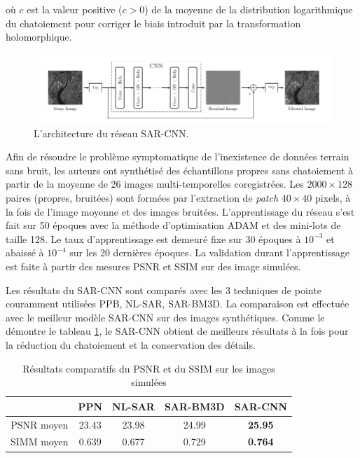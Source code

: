 où $c$ est la valeur positive ($c > 0$) de la moyenne de la distribution logarithmique du chatoiement pour corriger le biais introduit par la transformation holomorphique.

\begin{figure}
  \includegraphics[width=\linewidth]{figures/geo6393/SAR-CNN.png}
   \centering
  \caption{L'architecture du réseau SAR-CNN.}
  \label{fig:SAR-CNN}
\end{figure}

Afin de résoudre le problème symptomatique de l'inexistence de données terrain sans bruit, les auteurs ont synthétisé des échantillons propres sans chatoiement à partir de la moyenne de 26 images \acrsar multi-temporelles coregistrées. Les $2000 \times 128$ paires (propres, bruitées) sont formées par l'extraction de \textit{patch} $40 \times 40$ pixels, à la fois de l'image moyenne et des images bruitées.  L'apprentissage du réseau s'est fait sur 50 époques avec la méthode d'optimisation ADAM et des mini-lots de taille 128.  Le taux d'apprentissage est demeuré fixe sur 30 époques à $10^{-3}$ et abaissé à $10^{-4}$ sur les 20 dernières époques.  La validation durant l'apprentissage est faite à partir des mesures PSNR et SSIM sur des image \acrsar simulées.

Les résultats du SAR-CNN sont comparés avec les 3 techniques de pointe couramment utilisées PPB, NL-SAR, SAR-BM3D. La comparaison est effectuée avec le meilleur modèle SAR-CNN sur des images \acrsar synthétiques.  Comme le démontre le tableau \ref{tab:results-SAR-CNN}, le SAR-CNN obtient de meilleurs résultats à la fois pour la réduction du chatoiement et la conservation des détails.
\begin{table}[h!]
\begin{center}
 \begin{tabular}{||c c c c c||} 
 \hline
  & PPN & NL-SAR & SAR-BM3D & SAR-CNN \\ [0.5ex] 
 \hline
 PSNR moyen & 23.43 & 23.98 & 24.99 & \textbf{25.95} \\
 SIMM moyen & 0.639& 0.677 & 0.729 & \textbf{0.764} \\
 \hline
\end{tabular}
\end{center}
  \caption{Résultats comparatifs du PSNR et du SSIM sur les images \acrsar simulées}
  \label{tab:results-SAR-CNN}
\end{table}


